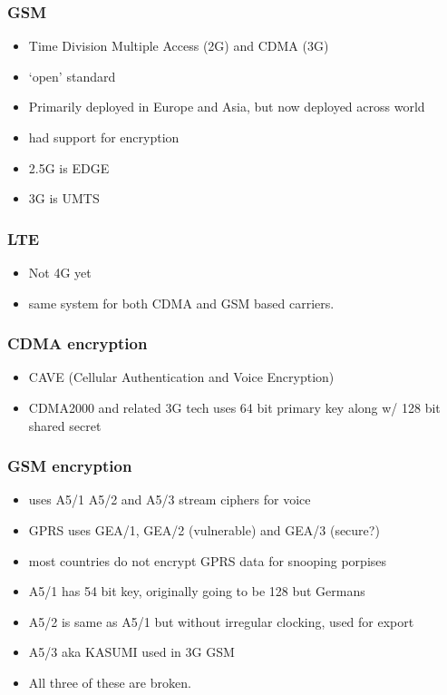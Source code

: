 \documentclass{beamer}
\begin{document}
\begin{frame}
  \frametitle{GSM}
  \begin{itemize}
    \item Time Division Multiple Access (2G) and CDMA (3G)
    \item `open' standard
    \item Primarily deployed in Europe and Asia, but now deployed across world
    \item had support for encryption
    \item 2.5G is EDGE
    \item 3G is UMTS
  \end{itemize}
\end{frame}

\begin{frame}
  \frametitle{LTE}
  \begin{itemize}
    \item Not 4G yet
    \item same system for both CDMA and GSM based carriers.
  \end{itemize}
\end{frame}



\begin{frame}
  \frametitle{CDMA encryption}
  \begin{itemize}
    \item CAVE (Cellular Authentication and Voice Encryption)
    \item CDMA2000 and related 3G tech uses 64 bit primary key along w/ 128 bit shared secret
  \end{itemize}
\end{frame}

\begin{frame}
  \frametitle{GSM encryption}
  \begin{itemize}
    \item uses A5/1 A5/2 and A5/3 stream ciphers for voice
    \item GPRS uses GEA/1, GEA/2 (vulnerable) and GEA/3 (secure?)
    \item most countries do not encrypt GPRS data for snooping porpises
    \item A5/1 has 54 bit key, originally going to be 128 but Germans
    \item A5/2 is same as A5/1 but without irregular clocking, used for export
    \item A5/3 aka KASUMI used in 3G GSM
    \item All three of these are broken.
  \end{itemize}
\end{frame}
\end{document}
